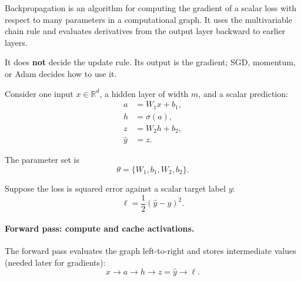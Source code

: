 \documentclass[11pt,a4paper]{article}
\theoremstyle{definition}
\begin{document}
Backpropagation is an algorithm for computing the gradient of a scalar loss with respect to many parameters in a computational graph. It uses the multivariable chain rule and evaluates derivatives from the output layer backward to earlier layers.

It does \textbf{not} decide the update rule. Its output is the gradient; SGD, momentum, or Adam decides how to use it.

\begin{example}
Consider one input $x \in \mathbb{R}^d$, a hidden layer of width $m$, and a scalar prediction:
\begin{align*}
a &= W_1 x + b_1, \\
h &= \sigma(a), \\
z &= W_2 h + b_2, \\
\hat{y} &= z.
\end{align*}

The parameter set is
\[ \theta = \{W_1, b_1, W_2, b_2\}. \]

Suppose the loss is squared error against a scalar target label $y$:
\[ \ell = \frac{1}{2}(\hat{y} - y)^2. \]

\paragraph*{Forward pass: compute and cache activations.}
The forward pass evaluates the graph left-to-right and stores intermediate values (needed later for gradients):
\[ x \to a \to h \to z = \hat{y} \to \ell. \]

\begin{center}
\end{center}
\end{example}
\end{document}
